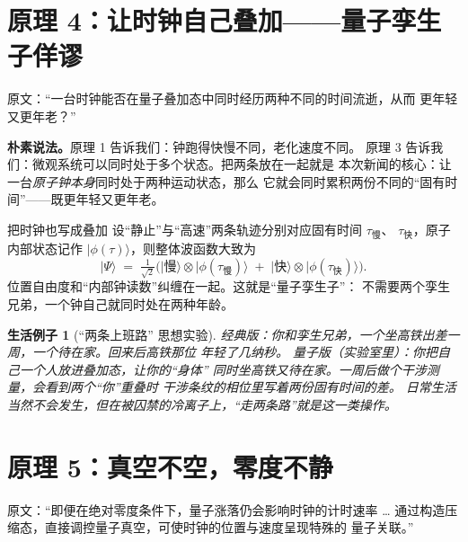 \documentclass[11pt,a4paper]{ctexart}
\newtheorem{example}[principle]{生活例子}
\begin{document}
\section{原理 4：让时钟自己叠加——量子孪生子佯谬}

\begin{newsblock}
原文：``一台时钟能否在量子叠加态中同时经历两种不同的时间流逝，从而
更年轻又更年老？''
\end{newsblock}

\begin{intuitionblock}
\textbf{朴素说法。}原理 1 告诉我们：钟跑得快慢不同，老化速度不同。
原理 3 告诉我们：微观系统可以同时处于多个状态。把两条放在一起就是
本次新闻的核心：让一台\emph{原子钟本身}同时处于两种运动状态，那么
它就会同时累积两份不同的``固有时间''——既更年轻又更年老。
\end{intuitionblock}

\begin{mathblock}{把时钟也写成叠加}
设``静止''与``高速''两条轨迹分别对应固有时间 $\tau_{\text{慢}}$、
$\tau_{\text{快}}$，原子内部状态记作 $\lvert\phi(\tau)\rangle$，则整体波函数大致为
\[
  \lvert\Psi\rangle \;=\;
  \tfrac{1}{\sqrt{2}}\Big(
    \lvert\text{慢}\rangle\otimes\lvert\phi(\tau_{\text{慢}})\rangle
    \;+\;
    \lvert\text{快}\rangle\otimes\lvert\phi(\tau_{\text{快}})\rangle
  \Big).
\]
位置自由度和``内部钟读数''纠缠在一起。这就是``量子孪生子''：
不需要两个孪生兄弟，一个钟自己就同时处在两种年龄。
\end{mathblock}

\begin{example}[``两条上班路'' 思想实验]
经典版：你和孪生兄弟，一个坐高铁出差一周，一个待在家。回来后高铁那位
\emph{年轻}了几纳秒。
量子版（实验室里）：你把\emph{自己一个人}放进叠加态，让你的``身体''
同时坐高铁又待在家。一周后做个干涉测量，会看到两个``你''重叠时
干涉条纹的相位里写着两份固有时间的差。
日常生活当然不会发生，但在被囚禁的冷离子上，``走两条路''就是这一类操作。
\end{example}

\section{原理 5：真空不空，零度不静}

\begin{newsblock}
原文：``即便在绝对零度条件下，量子涨落仍会影响时钟的计时速率 \dots
通过构造压缩态，直接调控量子真空，可使时钟的位置与速度呈现特殊的
量子关联。''
\end{newsblock}
\end{document}
